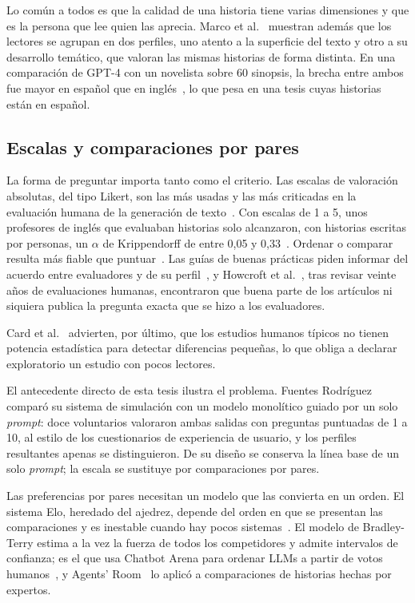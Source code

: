 Lo común a todos es que la calidad de una historia tiene varias dimensiones y que es la persona que
lee quien las aprecia. Marco et al.~\cite{marco2025} muestran además que los lectores se agrupan en
dos perfiles, uno atento a la superficie del texto y otro a su desarrollo temático, que valoran las
mismas historias de forma distinta. En una comparación de GPT-4 con un novelista sobre 60
sinopsis, la brecha entre ambos fue mayor en español que en inglés~\cite{marco2024}, lo que pesa en
una tesis cuyas historias están en español.

\subsection{Escalas y comparaciones por pares}\label{sec:escalas-pares}

La forma de preguntar importa tanto como el criterio. Las escalas de valoración absolutas, del tipo
Likert, son las más usadas y las más criticadas en la evaluación humana de la generación de
texto~\cite{amidei2019}. Con escalas de 1 a 5, unos profesores de inglés que evaluaban historias solo
alcanzaron, con historias escritas por personas, un $\alpha$ de Krippendorff de entre 0,05 y
0,33~\cite{chiang2023}. %
Ordenar o comparar resulta más fiable que puntuar~\cite{novikova2018,vanderlee2019}. Las guías de
buenas prácticas piden informar del acuerdo entre evaluadores y de su perfil~\cite{vanderlee2021}, y
Howcroft et al.~\cite{howcroft2020}, tras revisar veinte años de evaluaciones humanas, encontraron
que buena parte de los artículos ni siquiera publica la pregunta exacta que se hizo a los
evaluadores.

Card et al.~\cite{card2020} advierten, por último, que los estudios humanos típicos no
tienen potencia estadística para detectar diferencias pequeñas, lo que obliga a declarar
exploratorio un estudio con pocos lectores.

El antecedente directo de esta tesis ilustra el problema. Fuentes Rodríguez~\cite{fuentes2025}
comparó su sistema de simulación con un modelo monolítico guiado por un solo
\textit{prompt}: doce voluntarios valoraron ambas salidas con preguntas puntuadas de 1 a 10, al
estilo de los cuestionarios de experiencia de usuario, y los perfiles resultantes apenas se
distinguieron. %
De su diseño se conserva la línea base de un solo \textit{prompt}; la escala se sustituye por
comparaciones por pares.

Las preferencias por pares necesitan un modelo que las convierta en un orden. El sistema Elo,
heredado del ajedrez, depende del orden en que se presentan las comparaciones y es inestable cuando
hay pocos sistemas~\cite{boubdir2023}. El modelo de Bradley-Terry estima a la vez la fuerza de todos
los competidores y admite intervalos de confianza; es el que usa Chatbot Arena para ordenar LLMs a
partir de votos humanos~\cite{chiang2024}, y Agents' Room~\cite{huot2025} lo aplicó a comparaciones
de historias hechas por expertos.

